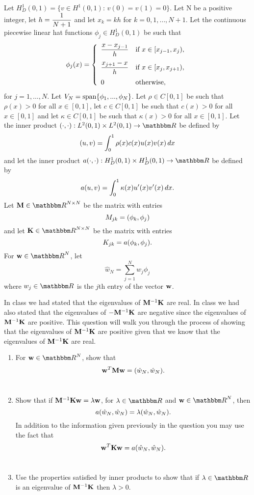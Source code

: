 
Let $H^1_D\left(0,1\right)=\{v\in H^1\left(0,1\right):\,v(0)=v(1)=0\}$. Let N be a positive integer, let $\displaystyle{h={1 \over N+1}}$ and let $x_k=kh$ for $k=0,1,\ldots,N+1$. Let the continuous piecewise linear hat functions $\phi_j\in H^1_D(0,1)$ be such that
\[
\phi_j(x) = \left\{\begin{array}{ll}
\displaystyle{{x-x_{j-1} \over h}} & \displaystyle{\mbox{if }x\in[x_{j-1},x_j)},
\\[10pt]
\displaystyle{{x_{j+1}-x \over h}} & \displaystyle{\mbox{if }x\in[x_j,x_{j+1})},
\\[10pt]
0 & \mbox{otherwise},
\end{array}\right.
\]
for $j=1,\ldots,N$. Let $V_N={\rm span}\{\phi_1,...,\phi_N\}$. Let $\rho\in C[0,1]$ be such that $\rho(x)>0$ for all $x\in[0,1]$, let $c\in C[0,1]$ be such that $c(x)>0$ for all $x\in[0,1]$ and let $\kappa\in C[0,1]$ be such that $\kappa(x)>0$ for all $x\in[0,1]$. Let the inner product $\ip{\cdot,\cdot}:L^2(0,1)\times L^2(0,1)\to\R$ be defined by
\[
(u,v)=\int_0^1\rho(x)c(x)u(x)v(x)\,dx
\]
and let the inner product $a\ip{\cdot,\cdot}:H^1_D(0,1)\times H^1_D(0,1)\to\R$ be defined by
\[
a(u,v)=\int_0^1\kappa(x)u'(x)v'(x)\,dx.
\]
Let $\BM\in\R^{N\times N}$ be the matrix with entries
\[
M_{jk}=(\phi_k,\phi_j)
\]
and let $\BK\in\R^{N\times N}$ be the matrix with entries
\[
K_{jk}=a(\phi_k,\phi_j).
\]
For $\Bw\in\R^N$, let
\[
\hat{w}_N=\sum_{j=1}^Nw_j\phi_j
\]
where $w_j\in\R$ is the $j$th entry of the vector ${\bf w}$.

In class we had stated that the eigenvalues of ${\bf M}^{-1}{\bf K}$ are real. In class we had also stated that the eigenvalues of $-{\bf M}^{-1}{\bf K}$ are negative since the eigenvalues of ${\bf M}^{-1}{\bf K}$ are positive. This question will walk you through the process of showing that the eigenvalues of ${\bf M}^{-1}{\bf K}$ are positive given that we know that the eigenvalues of ${\bf M}^{-1}{\bf K}$ are real.
\\
\begin{enumerate}
\item For $\Bw\in\R^N$, show that
\[
{\bf w}^T{\bf M}{\bf w}=(\hat{w}_N,\hat{w}_N).
\]
\\
\item Show that if ${\bf M}^{-1}{\bf K}{\bf w}=\lambda{\bf w}$, for $\lambda\in\R$ and $\Bw\in\R^N$, then
\[
a(\hat{w}_N,\hat{w}_N)=\lambda(\hat{w}_N,\hat{w}_N).
\]
In addition to the information given previously in the question you may use the fact that
\[
{\bf w}^T{\bf K}{\bf w}=a(\hat{w}_N,\hat{w}_N).
\]
\\
\item Use the properties satisfied by inner products to show that if $\lambda\in\R$ is an eigenvalue of ${\bf M}^{-1}{\bf K}$ then $\lambda>0$.
\end{enumerate}



